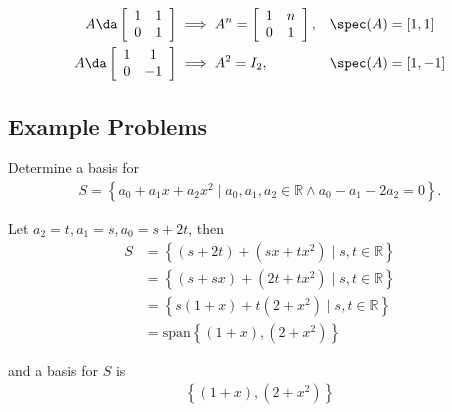 \begin{align*}
A \da \left[ \begin{array} { c c } { 1 } & { 1 } \\ { 0 } & { 1 } \end{array} \right] 
&\implies A^n = 
\left[ \begin{array} { c c } { 1 } & { n } \\ { 0 } & { 1 } \end{array} \right], 
&& \spec(A) = [1,1] \\
A \da \left[ \begin{array} { c c } { 1 } & { 1 } \\ { 0 } & { - 1 } \end{array} \right] 
&\implies A^2 = I_2,
&& \spec(A) = [1, -1]
\end{align*}

\hypertarget{example-problems}{%
\subsection{Example Problems}\label{example-problems}}

\begin{problem}[?]

Determine a basis for
\begin{align*}
S = \left\{a_0 + a_1 x + a_2 x^2\mid a_0,a_1,a_2 \in \mathbb{R} \land a_0 - a_1 -2a_2 =0\right\}.
\end{align*}

\end{problem}

\hrulefill

\begin{solution}

Let \(a_2=t, a_1=s, a_0=s+2t\), then
\begin{align*}
S     &= \left\{ (s+2t) + (sx+tx^2)\mid s,t\in\mathbb{R} \right\} \\
&= \left\{ (s+sx) + (2t+tx^2)\mid s,t\in\mathbb{R} \right\} \\
&= \left\{ s(1+x) + t(2+x^2)\mid s,t\in\mathbb{R} \right\} \\
&= \text{span}\left\{(1+x),(2+x^2)\right\}
\end{align*}

and a basis for \(S\) is
\begin{align*}
\left\{(1+x), (2+x^2)\right\}
\end{align*}

\end{solution}

